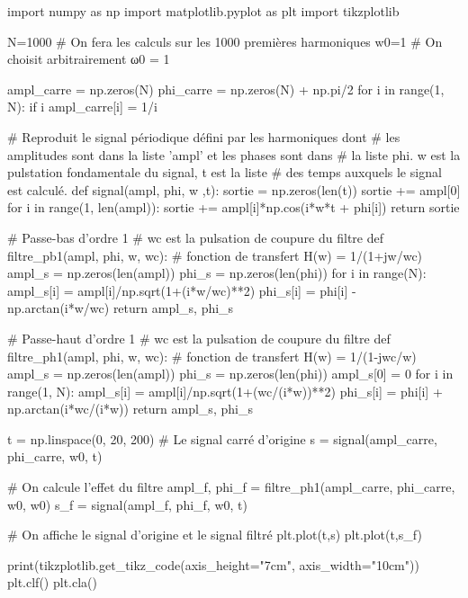 \documentclass{cours}
\begin{document}
\begin{pycode}
import numpy as np
import matplotlib.pyplot as plt
import tikzplotlib

N=1000    # On fera les calculs sur les 1000 premières harmoniques
w0=1      # On choisit arbitrairement ω0 = 1


ampl_carre = np.zeros(N)
phi_carre = np.zeros(N) + np.pi/2
for i in range(1, N):
    if i%
        ampl_carre[i] = 1/i

# Reproduit le signal périodique défini par les harmoniques dont 
# les amplitudes sont dans la liste 'ampl' et les phases sont dans 
# la liste phi. w est la pulstation fondamentale du signal, t est la liste
# des temps auxquels le signal est calculé.
def signal(ampl, phi, w ,t):
    sortie = np.zeros(len(t))
    sortie += ampl[0]
    for i in range(1, len(ampl)):
        sortie += ampl[i]*np.cos(i*w*t + phi[i])
    return sortie

# Passe-bas d'ordre 1
# wc est la pulsation de coupure du filtre
def filtre_pb1(ampl, phi, w, wc):
    # fonction de transfert H(w) = 1/(1+jw/wc)
    ampl_s = np.zeros(len(ampl))
    phi_s = np.zeros(len(phi))
    for i in range(N):
        ampl_s[i] = ampl[i]/np.sqrt(1+(i*w/wc)**2)
        phi_s[i]  = phi[i] - np.arctan(i*w/wc)
    return ampl_s, phi_s

# Passe-haut d'ordre 1
# wc est la pulsation de coupure du filtre
def filtre_ph1(ampl, phi, w, wc):
    # fonction de transfert H(w) = 1/(1-jwc/w)
    ampl_s = np.zeros(len(ampl))
    phi_s = np.zeros(len(phi))
    ampl_s[0] = 0
    for i in range(1, N):
        ampl_s[i] = ampl[i]/np.sqrt(1+(wc/(i*w))**2)
        phi_s[i]  = phi[i] + np.arctan(i*wc/(i*w))
    return ampl_s, phi_s

t = np.linspace(0, 20, 200)
# Le signal carré d'origine
s = signal(ampl_carre, phi_carre, w0, t)

# On calcule l'effet du filtre
ampl_f, phi_f = filtre_ph1(ampl_carre, phi_carre, w0, w0)
s_f = signal(ampl_f, phi_f, w0, t)

# On affiche le signal d'origine et le signal filtré
plt.plot(t,s)
plt.plot(t,s_f)
\end{pycode}

\begin{center}
  \begin{pycode}
print(tikzplotlib.get_tikz_code(axis_height="7cm", axis_width="10cm"))
plt.clf()
plt.cla()
  \end{pycode}
\end{center}
\end{document}
